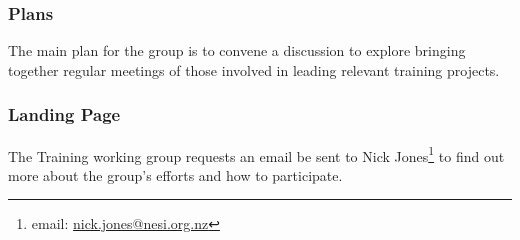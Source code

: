 \subsubsection{Plans}

The main plan for the group is to convene a discussion to explore bringing
together regular meetings of those involved in leading relevant training
projects.

\subsubsection{Landing Page}

The Training working group requests an email be sent to Nick Jones\footnote{email: 
\href{mailto:nick.jones@nesi.org.nz}{nick.jones@nesi.org.nz}} to find out more
about the group's efforts and how to participate.
